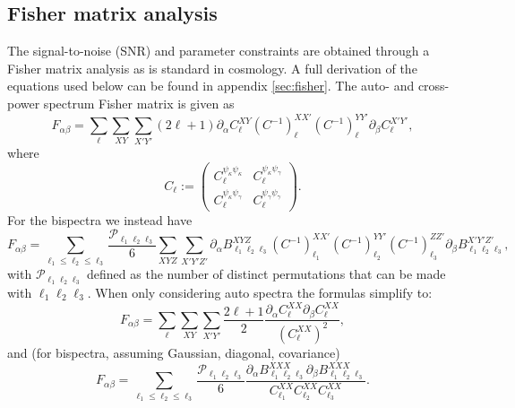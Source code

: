 \documentclass[11pt]{article} %
\begin{document}
\subsection{Fisher matrix analysis}
The signal-to-noise (SNR) and parameter constraints are obtained through a Fisher matrix analysis as is standard in cosmology\cite{dodelson2020modern}. A full derivation of the equations used below can be found in appendix \ref{sec:fisher}. The auto- and cross- power spectrum Fisher matrix is given as
\begin{equation*}
    F_{\alpha\beta} = \sum_{\ell} \sum_{XY}\sum_{X'Y'}(2\ell+1)\partial_\alpha C_\ell^{XY} (C^{-1})_\ell^{XX'}(C^{-1})_\ell^{YY'} \partial_\beta C^{X'Y'}_\ell,
\end{equation*}
where
\begin{equation*}
    C_{\ell} := \begin{pmatrix}
        C^{\psi_\kappa\psi_\kappa}_\ell & C^{\psi_\kappa\psi_\gamma}_\ell \\
        C^{\psi_\kappa\psi_\gamma}_\ell & C^{\psi_\gamma\psi_\gamma}_\ell
    \end{pmatrix}.
\end{equation*}
For the bispectra we instead have 
\begin{equation*}
    F_{\alpha\beta} = \sum_{\ell_1 \leq \ell_2 \leq \ell_3} \frac{\mathcal P _{\ell_1\ell_2\ell_3}}{6}
    \sum_{XYZ}\sum_{X'Y'Z'} 
    \partial_\alpha B^{X Y Z}_{\ell_1 \ell_2 \ell_3} 
    (C^{-1})^{X X'}_{\ell_1}
    (C^{-1})^{Y Y'}_{\ell_2}
    (C^{-1})^{Z Z'}_{\ell_3}
    \partial_\beta B^{X' Y' Z'}_{\ell_1 \ell_2 \ell_3},
\end{equation*}
with $\mathcal P_{\ell_1\ell_2\ell_3}$ defined as the number of distinct permutations that can be made with $\ell_1\ell_2\ell_3$. When only considering auto spectra the formulas simplify to:
\begin{equation*}
    F_{\alpha\beta} = \sum_{\ell} \sum_{XY}\sum_{X'Y'}\frac{2\ell+1}{2}\frac{\partial_{\alpha}C_\ell^{XX} \partial_\beta C^{XX}_\ell}{(C_\ell^{XX})^2},
\end{equation*}
and (for bispectra, assuming Gaussian, diagonal, covariance)
\begin{equation*}
    F_{\alpha\beta} = \sum_{\ell_1 \leq \ell_2 \leq \ell_3} \frac{\mathcal P _{\ell_1\ell_2\ell_3}}{6}
    \frac{\partial_\alpha B^{X X X}_{\ell_1 \ell_2 \ell_3} 
    \partial_\beta B^{XXX}_{\ell_1 \ell_2 \ell_3}}{C^{XX}_{\ell_1}C^{XX}_{\ell_2}C^{XX}_{\ell_3}}.
\end{equation*}
\end{document}
